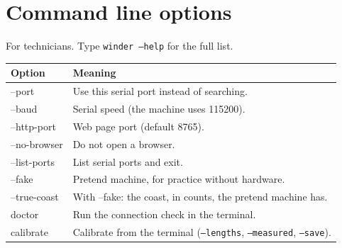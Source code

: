 \section{Command line options}
For technicians. Type \texttt{winder --help} for the full list.
\begin{center}
\small
\begin{tabularx}{\textwidth}{@{}>{\ttfamily}l>{\raggedright\arraybackslash}X@{}}
\toprule
\textrm{\textbf{Option}} & \textbf{Meaning} \\
\midrule
--port & Use this serial port instead of searching. \\
--baud & Serial speed (the machine uses 115200). \\
--http-port & Web page port (default 8765). \\
--no-browser & Do not open a browser. \\
--list-ports & List serial ports and exit. \\
--fake & Pretend machine, for practice without hardware. \\
--true-coast & With --fake: the coast, in counts, the pretend machine has. \\
doctor & Run the connection check in the terminal. \\
calibrate & Calibrate from the terminal (\texttt{--lengths}, \texttt{--measured}, \texttt{--save}). \\
\bottomrule
\end{tabularx}
\end{center}
